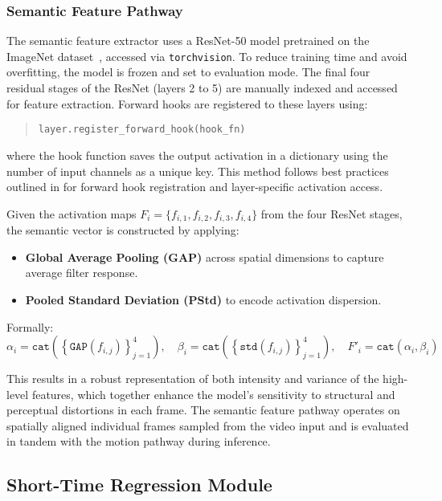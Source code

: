 \subsubsection{Semantic Feature Pathway}

The semantic feature extractor uses a ResNet-50 model pretrained on the ImageNet dataset~\cite{5206848}, accessed via \texttt{torchvision}. To reduce training time and avoid overfitting, the model is frozen and set to evaluation mode. The final four residual stages of the ResNet (layers 2 to 5) are manually indexed and accessed for feature extraction. Forward hooks are registered to these layers using:
\begin{quote}
\texttt{layer.register\_forward\_hook(hook\_fn)}
\end{quote}
where the hook function saves the output activation in a dictionary using the number of input channels as a unique key. This method follows best practices outlined in \cite{nanbhasblog,torchhooksdoc} for forward hook registration and layer-specific activation access.

Given the activation maps $F_i = \{f_{i,1}, f_{i,2}, f_{i,3}, f_{i,4}\}$ from the four ResNet stages, the semantic vector is constructed by applying:
\begin{itemize}
    \item \textbf{Global Average Pooling (GAP)} across spatial dimensions to capture average filter response.
    \item \textbf{Pooled Standard Deviation (PStd)} to encode activation dispersion.
\end{itemize}

Formally:
\[
\alpha_i = \texttt{cat}\left( \left\{\texttt{GAP}(f_{i,j})\right\}_{j=1}^{4} \right),
\quad
\beta_i = \texttt{cat}\left( \left\{\texttt{std}(f_{i,j})\right\}_{j=1}^{4} \right),
\quad
F'_i = \texttt{cat}(\alpha_i, \beta_i)
\]

This results in a robust representation of both intensity and variance of the high-level features, which together enhance the model's sensitivity to structural and perceptual distortions in each frame. The semantic feature pathway operates on spatially aligned individual frames sampled from the video input and is evaluated in tandem with the motion pathway during inference.

\subsection{Short-Time Regression Module}

